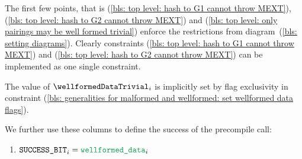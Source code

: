 \saNote{}
The first few points, that is
(\ref{bls: top level: hash to G1 cannot throw MEXT}),
(\ref{bls: top level: hash to G2 cannot throw MEXT}) and
(\ref{bls: top level: only pairings may be well formed trivial})
enforce the restrictions from
diagram~(\ref{bls: setting diagrams}).
Clearly constraints
(\ref{bls: top level: hash to G1 cannot throw MEXT}) and
(\ref{bls: top level: hash to G2 cannot throw MEXT})
can be implemented as one single constraint.

\saNote{} The value of $\wellformedDataTrivial_{i}$ is implicitly set by flag exclusivity in constraint (\ref{bls: generalities for malformed and wellformed: set wellformed data flags}).

\noindent We further use these columns to define the success of the precompile call:
\begin{enumerate}[resume]
    \item $\blsSuccessBit  _{i} = \locWellformedData _{i}$
\end{enumerate}
